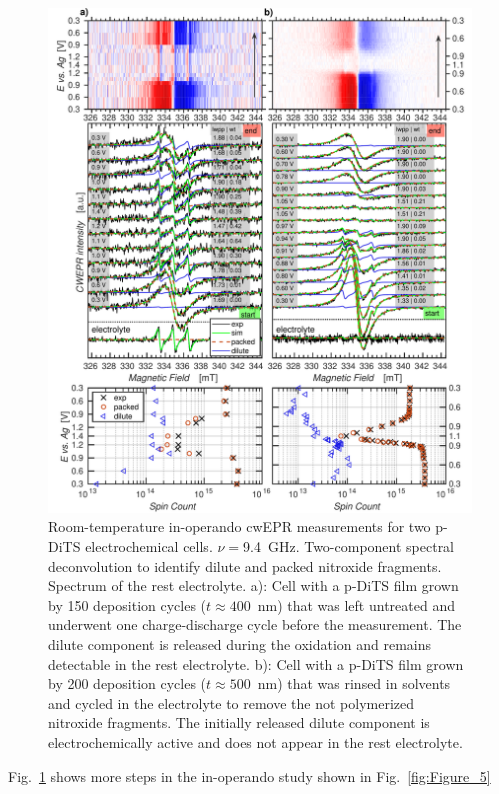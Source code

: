 \begin{figure}[H]
\center
	\includegraphics[width=1\textwidth]{./operando_epr/figures/degradation/operando_degradation_dits.pdf}
\caption{Room-temperature in-operando cwEPR measurements for two p-DiTS electrochemical cells. $\nu=$9.4~GHz. Two-component spectral deconvolution to identify dilute and packed nitroxide fragments. Spectrum of the rest electrolyte. a): Cell with a p-DiTS film grown by 150 deposition cycles ($t\approx 400$~nm) that was left untreated and underwent one charge-discharge cycle before the measurement. The dilute component is released during the oxidation and remains detectable in the rest electrolyte. b): Cell with a p-DiTS film grown by 200 deposition cycles ($t\approx 500$~nm) that was rinsed in solvents and cycled in the electrolyte to remove the not polymerized nitroxide fragments. The initially released dilute component is electrochemically active and does not appear in the rest electrolyte.}
\label{fig:S6}
\end{figure}


Fig.~\ref{fig:S6} shows more steps in the in-operando study shown in Fig.~\ref{fig:Figure_5}






